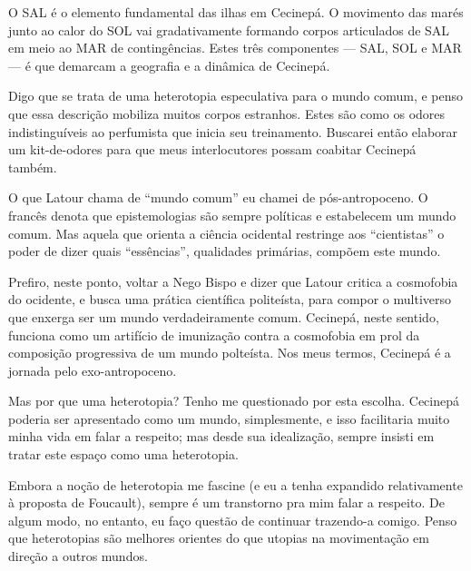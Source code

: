 O SAL é o elemento fundamental das ilhas em Cecinepá. O movimento das marés junto ao calor do SOL vai gradativamente formando corpos articulados de SAL em meio ao MAR de contingências. Estes três componentes --- SAL, SOL e MAR --- é que demarcam a geografia e a dinâmica de Cecinepá.

Digo que se trata de uma heterotopia especulativa para o mundo comum, e penso que essa descrição mobiliza muitos corpos estranhos. Estes são como os odores indistinguíveis ao perfumista que inicia seu treinamento. Buscarei então elaborar um kit-de-odores para que meus interlocutores possam coabitar Cecinepá também.

O que Latour chama de \enquote{mundo comum} eu chamei de pós-antropoceno. O francês denota que epistemologias são sempre políticas e estabelecem um mundo comum. Mas aquela que orienta a ciência ocidental restringe aos \enquote{cientistas} o poder de dizer quais \enquote{essências}, qualidades primárias, compõem este mundo.

Prefiro, neste ponto, voltar a Nego Bispo e dizer que Latour critica a cosmofobia do ocidente, e busca uma prática científica politeísta, para compor o multiverso que enxerga ser um mundo verdadeiramente comum. Cecinepá, neste sentido, funciona como um artifício de imunização contra a cosmofobia em prol da composição progressiva de um mundo polteísta. Nos meus termos, Cecinepá é a jornada pelo exo-antropoceno.


Mas por que uma heterotopia? Tenho me questionado por esta escolha. Cecinepá poderia ser apresentado como um mundo, simplesmente, e isso facilitaria muito minha vida em falar a respeito; mas desde sua idealização, sempre insisti em tratar este espaço como uma heterotopia.


Embora a noção de heterotopia me fascine (e eu a tenha expandido relativamente à proposta de Foucault), sempre é um transtorno pra mim falar a respeito. De algum modo, no entanto, eu faço questão de continuar trazendo-a comigo. Penso que heterotopias são melhores orientes do que utopias na movimentação em direção a outros mundos.

